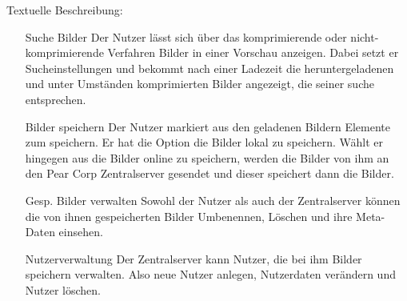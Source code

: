 \documentclass[parskip=full]{scrartcl}
\begin{document}
Textuelle Beschreibung:
\begin{itemize}
	\item[Suche Bilder] Der Nutzer lässt sich über das komprimierende oder nicht-komprimierende Verfahren Bilder in einer Vorschau anzeigen. Dabei setzt er Sucheinstellungen und bekommt nach einer Ladezeit die heruntergeladenen und unter Umständen komprimierten Bilder angezeigt, die seiner suche entsprechen.
	\item[Bilder speichern] Der Nutzer markiert aus den geladenen Bildern Elemente zum speichern. Er hat die Option die Bilder lokal zu speichern. Wählt er hingegen aus die Bilder online zu speichern, werden die Bilder von ihm an den Pear Corp Zentralserver gesendet und dieser speichert dann die Bilder.
	\item[Gesp. Bilder verwalten] Sowohl der Nutzer als auch der Zentralserver können die von ihnen gespeicherten Bilder Umbenennen, Löschen und ihre \Gls{Meta-Daten} einsehen.
	\item[Nutzerverwaltung] Der Zentralserver kann Nutzer, die bei ihm Bilder speichern verwalten. Also neue Nutzer anlegen, Nutzerdaten verändern und Nutzer löschen.
\end{itemize}



%
%
\printnoidxglossaries
\end{document}
